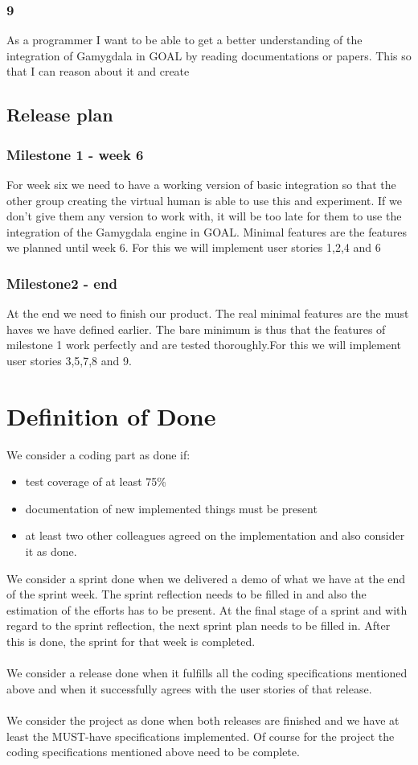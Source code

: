 \documentclass[]{article}
\begin{document}
\subsubsection*{9}As a programmer I want to be able to get a better understanding of the integration of Gamygdala in GOAL by reading documentations or papers. This so that I can reason about it and create 

\subsection{Release plan}
\subsubsection{Milestone 1 - week 6}
For week six we need to have a working version of basic integration so that the other group creating the virtual human is able to use this and experiment. If we don't give them any version to work with, it will be too late for them to use the integration of the Gamygdala engine in GOAL. Minimal features are the features we planned until week 6. For this we will implement user stories 1,2,4 and 6
\subsubsection{Milestone2 - end}
At the end we need to finish our product. The real minimal features are the must haves we have defined earlier. The bare minimum is thus that the features of milestone 1 work perfectly and are tested thoroughly.For this we will implement user stories 3,5,7,8 and 9.
\pagebreak
\section{Definition of Done}
We consider a coding part as done if:
\begin{itemize}
	\item test coverage of at least 75\%
	\item documentation of new implemented things must be present
	\item at least two other colleagues agreed on the implementation and also consider it as done.
\end{itemize}
We consider a sprint done when we delivered a demo of what we have at the end of the sprint week. The sprint reflection needs to be filled in and also the estimation of the efforts has to be present. At the final stage of a sprint and with regard to the sprint reflection, the next sprint plan needs to be filled in. After this is done, the sprint for that week is completed.\\
\\
We consider a release done when it fulfills all the coding specifications mentioned above and when it successfully agrees with the user stories of that release.\\
\\
We consider the project as done when both releases are finished and we have at least the MUST-have specifications implemented. Of course for the project the coding specifications mentioned above need to be complete.
\clearpage
\printglossaries
\end{document}
